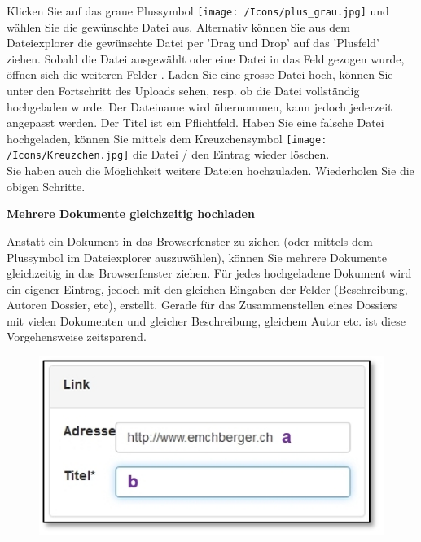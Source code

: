 
Klicken Sie auf das graue Plussymbol \texttt{[image: /Icons/plus\_grau.jpg]}  und wählen Sie die gewünschte Datei aus. Alternativ können Sie aus dem Dateiexplorer die gewünschte Datei per 'Drag und Drop' auf das 'Plusfeld' ziehen. Sobald die Datei ausgewählt oder eine Datei in das Feld gezogen wurde, öffnen sich die weiteren Felder . Laden Sie eine grosse Datei hoch, können Sie unter  den Fortschritt des Uploads sehen, resp. ob die Datei vollständig hochgeladen wurde. Der Dateiname  wird übernommen, kann jedoch jederzeit angepasst werden. Der Titel ist ein Pflichtfeld. Haben Sie eine falsche Datei hochgeladen, können Sie mittels dem Kreuzchensymbol \texttt{[image: /Icons/Kreuzchen.jpg]}  die Datei / den Eintrag wieder löschen. \\
Sie haben auch die Möglichkeit weitere Dateien hochzuladen. Wiederholen Sie die obigen Schritte.

\vspace{\baselineskip}

\textbf{Mehrere Dokumente gleichzeitig hochladen}

Anstatt ein Dokument in das Browserfenster zu ziehen (oder mittels dem Plussymbol im Dateiexplorer auszuwählen), können Sie mehrere Dokumente gleichzeitig in das Browserfenster ziehen. Für jedes hochgeladene Dokument wird ein eigener Eintrag, jedoch mit den gleichen Eingaben der Felder (Beschreibung, Autoren Dossier, etc), erstellt. Gerade für das Zusammenstellen eines Dossiers mit vielen Dokumenten und gleicher Beschreibung, gleichem Autor etc. ist diese Vorgehensweise zeitsparend. 

\vspace{\baselineskip}

\begin{figure}   
  \vspace{-35pt}     
  \begin{center}
    \includegraphics[width=1\linewidth]{../chapters/11_Dokumentenablage/pictures/11-2-2_Linktitel.jpg}
  \end{center}
  \vspace{-20pt}
  \vspace{-10pt}
\end{figure}


